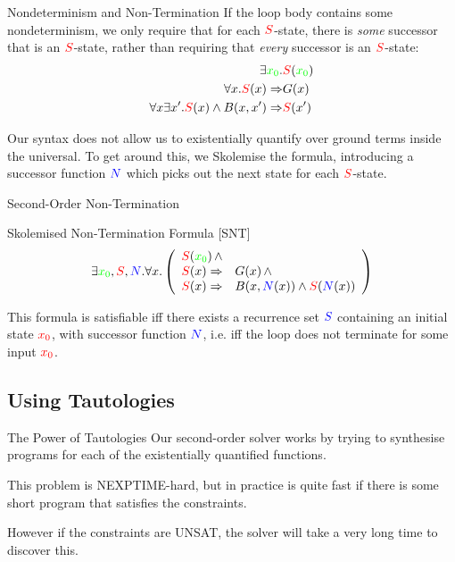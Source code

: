 \documentclass[xcolor=pdftex,t,11pt]{beamer}
\newcommand{\red}[1]{\textcolor{red}{#1}}
\newcommand{\blue}[1]{\textcolor{blue}{#1}}
\newcommand{\green}[1]{\textcolor{green}{#1}}
\begin{document}
\begin{frame}[fragile]{Nondeterminism and Non-Termination}
 If the loop body contains some nondeterminism, we only require that for each $\red{S}$-state, there is
 \emph{some} successor that is an $\red{S}$-state, rather than requiring that \emph{every} successor is an
 $\red{S}$-state:
  \begin{align*}
  \exists \green{x_0} . & \red{S}(\green{x_0}) \\
  \forall x . \red{S}(x) \Rightarrow & G(x) \\
  \forall x \exists x' . \red{S}(x) \wedge B(x, x') \Rightarrow & \red{S}(x')
 \end{align*}

 \vspace{1em}
 
 \pause
 
Our syntax does not allow us to existentially quantify over ground terms inside the universal.  To
get around this, we Skolemise the formula, introducing a successor function $\blue{N}$ which picks
out the next state for each $\red{S}$-state.
\end{frame}

\begin{frame}{Second-Order Non-Termination}

\begin{block}{Skolemised Non-Termination Formula [SNT]}
 \[
 \exists \green{x_0}, \red{S}, \blue{N} . \forall x . \left ( \begin{array}{rl}
   \red{S}(\green{x_0}) \, \wedge & \\
   \red{S}(x) \Rightarrow & G(x) \, \wedge \\
   \red{S}(x) \Rightarrow & B(x, \blue{N}(x)) \wedge \red{S}(\blue{N}(x))
   \end{array} \right )
 \]
 \end{block}

 \vspace{1em}

This formula is satisfiable iff there exists a recurrence set $\blue{S}$ containing
an initial state $\red{x_0}$, with successor function $\blue{N}$, i.e. iff the loop
does not terminate for some input $\red{x_0}$.
\end{frame}

\subsection{Using Tautologies}

\begin{frame}{The Power of Tautologies}
 Our second-order solver works by trying to synthesise programs for each of the existentially quantified functions.

 \vspace{1em}

 This problem is NEXPTIME-hard, but in practice is quite fast if there is some short program that satisfies
 the constraints.

 \vspace{1em}

 However if the constraints are UNSAT, the solver will take a very long time to discover this.
\end{frame}
\end{document}
